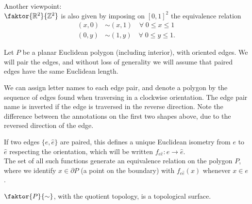 \begin{example}
	Another viewpoint: \\
	$\faktor{\mathbb R^2}{\mathbb Z^2}$ is also given by imposing on $[0, 1]^2$ the equivalence  relation
	\begin{align*}
		(x, 0) &\sim (x, 1) \quad \forall \; 0 \leq x \leq 1\\
		(0, y) &\sim (1, y) \quad \forall \; 0 \leq y \leq 1.
	\end{align*} 
\end{example}

\begin{example}
	Let $P$ be a planar Euclidean polygon (including interior), with oriented edges.
	We will pair the edges, and without loss of generality we will assume that paired edges have the same Euclidean length.
	\begin{center}
		\quad
		\quad
	\end{center}
	We can assign letter names to each edge pair, and denote a polygon by the sequence of edges found when traversing in a clockwise orientation.
	The edge pair name is inverted if the edge is traversed in the reverse direction.
	Note the difference between the annotations on the first two shapes above, due to the reversed direction of the edge.

	If two edges $\{e, \hat e\}$ are paired, this defines a unique Euclidean isometry from $e$ to $\hat e$ respecting the orientation, which will be written $f_{e\hat e} : e \to \hat e$. \\
	The set of all such functions generate an equivalence relation on the polygon $P$, where we identify $x \in \partial P$ (a point on the boundary) with $f_{e \hat{e}}(x)$ whenever $x \in e$.

	\begin{lemma}
		$\faktor{P}{\sim}$, with the quotient topology, is a topological surface.
	\end{lemma}
\end{example}

